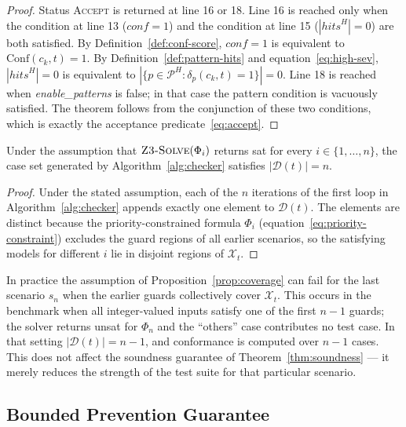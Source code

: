 \begin{proof}
Status \textsc{Accept} is returned at line 16 or 18.  Line 16 is reached
only when the condition at line 13 ($\mathit{conf} = 1$) and the condition
at line 15 ($|\mathit{hits}^H| = 0$) are both satisfied.  By
Definition~\ref{def:conf-score}, $\mathit{conf} = 1$ is equivalent to
$\mathrm{Conf}(c_k, t) = 1$.  By Definition~\ref{def:pattern-hits} and
equation~\eqref{eq:high-sev}, $|\mathit{hits}^H| = 0$ is equivalent to
$|\{p \in \mathcal{P}^H : \delta_p(c_k,t)=1\}| = 0$.  Line 18 is reached
when \textit{enable\_patterns} is false; in that case the pattern condition
is vacuously satisfied.  The theorem follows from the conjunction of these
two conditions, which is exactly the acceptance predicate~\eqref{eq:accept}.
\end{proof}

\begin{proposition}
\label{prop:coverage}
Under the assumption that $\textsc{Z3-Solve}(\Phi_i)$ returns \textsf{sat}
for every $i \in \{1, \ldots, n\}$, the case set generated by
Algorithm~\ref{alg:checker} satisfies $|\mathcal{D}(t)| = n$.
\end{proposition}

\begin{proof}
Under the stated assumption, each of the $n$ iterations of the first loop
in Algorithm~\ref{alg:checker} appends exactly one element to $\mathcal{D}(t)$.
The elements are distinct because the priority-constrained formula $\Phi_i$
(equation~\eqref{eq:priority-constraint}) excludes the guard regions of all
earlier scenarios, so the satisfying models for different $i$ lie in disjoint
regions of $\mathcal{X}_t$.
\end{proof}

\begin{remark}
In practice the assumption of Proposition~\ref{prop:coverage} can fail for
the last scenario $s_n$ when the earlier guards collectively cover
$\mathcal{X}_t$.  This occurs in the benchmark when all integer-valued inputs
satisfy one of the first $n-1$ guards; the solver returns \textsf{unsat} for
$\Phi_n$ and the ``others'' case contributes no test case.  In that setting
$|\mathcal{D}(t)| = n - 1$, and conformance is computed over $n-1$ cases.
This does not affect the soundness guarantee of
Theorem~\ref{thm:soundness} — it merely reduces the strength of the
test suite for that particular scenario.
\end{remark}

\subsection{Bounded Prevention Guarantee}
\label{subsec:method:prevention}

